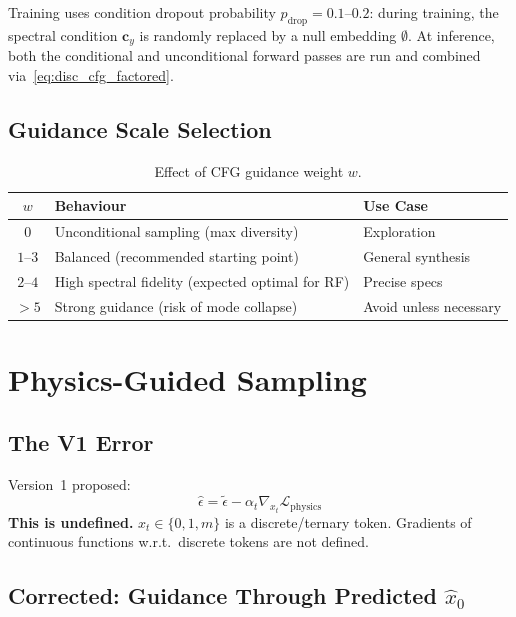 \documentclass[12pt,a4paper]{article}
\newcommand{\cy}{\mathbf{c}_y}
\newcommand{\WARN}[1]{\begin{tcolorbox}[warnbox, title=V1 Error — Corrected in V2]#1\end{tcolorbox}}
\newcommand{\FIX}[1]{\begin{tcolorbox}[fixbox, title=V2 Fix]#1\end{tcolorbox}}
\theoremstyle{definition}
\theoremstyle{plain}
\theoremstyle{remark}
\begin{document}
\FIX{
Training uses condition dropout probability $p_{\mathrm{drop}} = 0.1$--$0.2$:
during training, the spectral condition $\cy$ is randomly replaced by a null embedding
$\emptyset$.
At inference, both the conditional and unconditional forward passes are run and combined
via~\eqref{eq:disc_cfg_factored}.
}

\subsection{Guidance Scale Selection}

\begin{table}[H]
\centering
\caption{Effect of CFG guidance weight $w$.}
\label{tab:cfg_w}
\begin{tabular}{cll}
\toprule
$w$ & Behaviour & Use Case \\
\midrule
$0$   & Unconditional sampling (max diversity)      & Exploration \\
$1$--$3$ & Balanced (recommended starting point)   & General synthesis \\
$2$--$4$ & High spectral fidelity (expected optimal for RF) & Precise specs \\
$>5$  & Strong guidance (risk of mode collapse)     & Avoid unless necessary \\
\bottomrule
\end{tabular}
\end{table}

\section{Physics-Guided Sampling}
\label{sec:guidance}

\subsection{The V1 Error}

\WARN{
Version~1 proposed:
\[
  \hat{\epsilon} = \tilde{\epsilon}
    - \alpha_t \nabla_{x_t} \mathcal{L}_{\mathrm{physics}}
\]
\textbf{This is undefined.}
$x_t \in \{0, 1, m\}$ is a discrete/ternary token.
Gradients of continuous functions w.r.t.\ discrete tokens are not defined.
}

\subsection{Corrected: Guidance Through Predicted $\hat{x}_0$}
\end{document}
